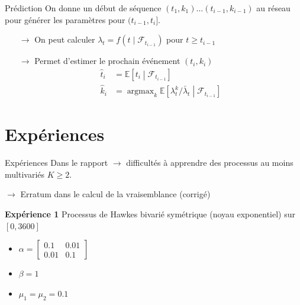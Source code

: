 \documentclass{beamer}
\newcommand{\EE}{\mathbb{E}}
\DeclareMathOperator*{\argmax}{argmax} %
\begin{document}
\begin{frame}{Prédiction}
On donne un début de séquence $(t_1,k_1)\ldots (t_{i-1}, k_{i-1})$ au réseau pour générer les paramètres pour $(t_{i-1}, t_i]$.
\begin{itemize}
	\item[$\rightarrow$] On peut calculer $\lambda_t = f(t\mid\mathcal{F}_{t_{i-1}})$ pour $t\geq t_{i-1}$
	\item[$\rightarrow$] Permet d'estimer le prochain événement $(t_i, k_i)$
	\[
	\begin{aligned}
		\hat{t}_i &= \EE\left[t_i \middle| \mathcal{F}_{t_{i-1}}\right] \\
		\hat{k}_i &= \argmax_{k}\EE\left[\lambda^k_t/\bar{\lambda}_t\middle| \mathcal{F}_{t_{i-1}} \right]
	\end{aligned}
	\]
\end{itemize}
\end{frame}

\section{Expériences}

\begin{frame}{Expériences}
Dans le rapport $\rightarrow$ difficultés à apprendre des processus au moins multivariés $K\geq 2$.\pause

$\rightarrow$ Erratum dans le calcul de la vraisemblance (corrigé)

\textbf{Expérience 1} Processus de Hawkes bivarié symétrique (noyau exponentiel) sur $[0, 3600]$
\begin{itemize}
	\item $\alpha = \begin{bmatrix}0.1 & 0.01 \\ 0.01 & 0.1\end{bmatrix}$
	\item $\beta = 1$
	\item $\mu_1 = \mu_2 = \num{0.1}$
\end{itemize}
\end{frame}
\end{document}
